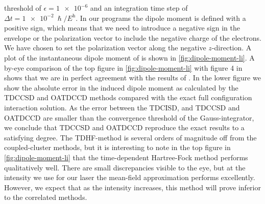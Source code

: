         threshold of $\epsilon = \num{1e-6}$ and an integration time step of
        $\Delta t = \SI{1e-2}{\hslash/\hartree}$.
        In our programs the dipole moment is defined with a positive sign,
        which means that we need to introduce a negative sign in the
        envelope or the polarization vector to include the negative charge
        of the electrons.
        We have chosen to set the polarization vector along the negative
        $z$-direction.
        A plot of the instantaneous dipole moment of  is shown in
        \autoref{fig:dipole-moment-li}.
        A by-eye comparison of the top figure in
        \autoref{fig:dipole-moment-li} with figure 4 in 
        \cite{li_2005} shows that we are in perfect agreement with the
        results of \citeauthor{li_2005}.
        In the lower figure we show the absolute error in the induced dipole
        moment as calculated by the TDCCSD and OATDCCD methods compared with
        the exact full configuration interaction solution.
        As the error between the TDCISD, and TDCCSD and OATDCCD are smaller than
        the convergence threshold of the Gauss-integrator, we conclude that
        TDCCSD and OATDCCD reproduce the exact results to a satisfying degree.
        The TDHF-method is several orders of magnitude off from the
        coupled-cluster methods, but it is interesting to note in the top figure
        in \autoref{fig:dipole-moment-li} that the time-dependent Hartree-Fock
        method performs qualitatively well.
        There are small discrepancies visible to the eye, but at the intensity
        we use for our laser the mean-field approximation performs excellently.
        However, we expect that as the intensity increases, this method will
        prove inferior to the correlated methods.

